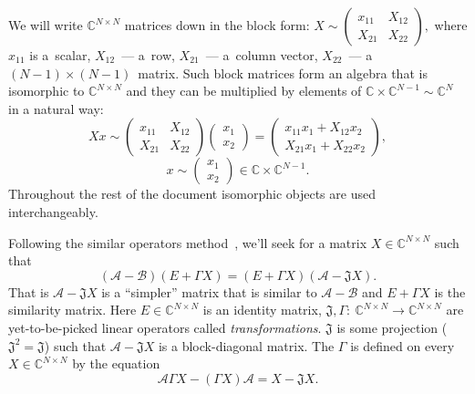 We will write \( \mathbb{C}^{N\times N} \) matrices down in the block form:
\( X{\sim}
    \begin{pmatrix}
    x_{11} & X_{12} \\
    X_{21} & X_{22}
    \end{pmatrix}, \)
    where \( x_{11} \) is a~scalar,
    \( X_{12} \)~--- a~row, \( X_{21} \)~--- a~column vector,
    \( X_{22} \)~--- a \( {(N{-}1){\times}(N{-}1)} \)~matrix.
Such block matrices form an algebra that is isomorphic to \( \mathbb{C}^{N\times N} \)
and they can be multiplied by elements of \( \mathbb{C}\times\mathbb{C}^{N-1}\sim\mathbb{C}^N \)
in a natural way:
\[
    X x \sim
    \begin{pmatrix}
    x_{11} & X_{12} \\
    X_{21} & X_{22}
    \end{pmatrix}
    \begin{pmatrix} x_1 \\ x_2 \end{pmatrix}
  = \begin{pmatrix}
      x_{11} x_1 + X_{12} x_2 \\
      X_{21} x_1 + X_{22} x_2
      \end{pmatrix},
    \]
\[
      x \sim
      \begin{pmatrix} x_1 \\ x_2 \end{pmatrix}
          \in \mathbb{C}\times\mathbb{C}^{N-1}.
    \]
Throughout the rest of the document isomorphic objects
    are used interchangeably.

Following the similar operators method~\cite{baskakov-split},
    we'll seek for a matrix \( X{\in}\mathbb{C}^{N{\times}N} \) such that
\begin{equation}\label{kozlukovsv:eq:similarity}
    (\mathcal{A-B})(E+\Gamma X) =
    (E+\Gamma X)(\mathcal{A} - \mathfrak{J} X).
\end{equation}
That is \( \mathcal{A}{-}\mathfrak{J} X \) is a ``simpler'' matrix
    that is similar to \( \mathcal{A}{-}\mathcal{B} \)
    and \( E{+}\Gamma X \) is the similarity matrix.
Here \( E\in{\mathbb{C}^{N{\times}N}} \) is an identity matrix,
    \( \mathfrak{J},\Gamma{:}\ \mathbb{C}^{N{\times}N}{\to}\mathbb{C}^{N{\times}N} \)
    are yet-to-be-picked linear operators called \emph{transformations}.
\( \mathfrak{J} \) is some projection (\(\mathfrak{J}^2=\mathfrak{J}\))
    such that \( \mathcal{A} - \mathfrak{J}X \) is a block-diagonal matrix.
The \( \Gamma \) is defined on every
    \( X\in {\mathbb{C}^{N{\times}N}} \)
    by the equation
\begin{equation}\label{eq:kozlukovsv:gamma}
    \mathcal{A}\Gamma X - (\Gamma X) \mathcal{A} = X - \mathfrak{J}X.
\end{equation}

